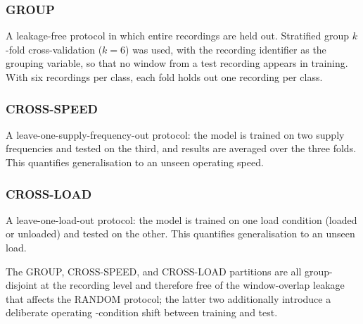 \subsubsection{GROUP}
A leakage-free protocol in which entire recordings are held out. Stratified
group $k$-fold cross-validation ($k=6$) was used, with the recording identifier as
the grouping variable, so that no window from a test recording appears in
training. With six recordings per class, each fold holds out one recording per
class.

\subsubsection{CROSS-SPEED}
A leave-one-supply-frequency-out protocol: the model is trained on two supply
frequencies and tested on the third, and results are averaged over the three
folds. This quantifies generalisation to an unseen operating speed.

\subsubsection{CROSS-LOAD}
A leave-one-load-out protocol: the model is trained on one load condition
(loaded or unloaded) and tested on the other. This quantifies generalisation to
an unseen load.

The GROUP, CROSS-SPEED, and CROSS-LOAD partitions are all group-disjoint at the
recording level and therefore free of the window-overlap leakage that affects the
RANDOM protocol; the latter two additionally introduce a deliberate operating
-condition shift between training and test.

